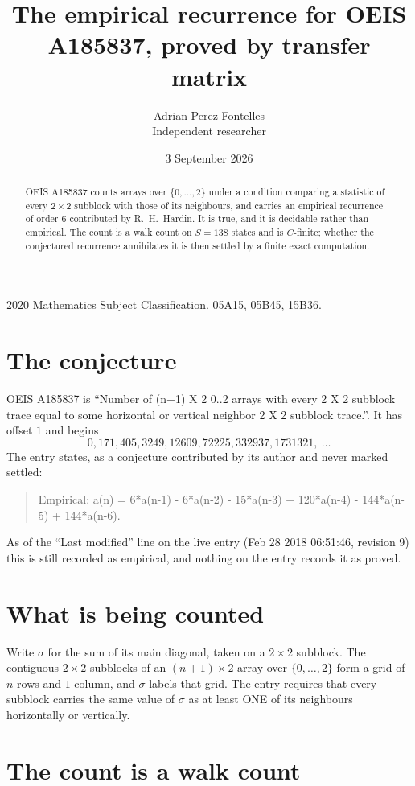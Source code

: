 \documentclass[11pt,a4paper]{article}
\title{The empirical recurrence for OEIS A185837, proved by transfer matrix}
\author{Adrian Perez Fontelles\\ \small Independent researcher}
\date{3 September 2026}
\theoremstyle{plain}
\theoremstyle{definition}
\begin{document}
\maketitle

\begin{abstract}
OEIS A185837 counts arrays over $\{0,\dots,2\}$ under a condition comparing a statistic of
every $2\times2$ subblock with those of its neighbours, and carries an empirical recurrence
of order $6$ contributed by R.~H.~Hardin. It is true, and it is decidable rather than
empirical. The count is a walk count on $S=138$ states and is $C$-finite; whether the
conjectured recurrence annihilates it is then settled by a finite exact computation.
\end{abstract}

\noindent\small 2020 Mathematics Subject Classification. 05A15, 05B45, 15B36.\normalsize

\section{The conjecture}

OEIS A185837 is ``Number of (n+1) X 2 0..2 arrays with every 2 X 2 subblock trace equal to some horizontal or vertical neighbor 2 X 2 subblock trace.''. It has offset $1$ and begins
\[
0, 171, 405, 3249, 12609, 72225, 332937, 1731321,\ \dots
\]
The entry states, as a conjecture contributed by its author and never marked settled:
\begin{quote}
Empirical: a(n) = 6*a(n-1) - 6*a(n-2) - 15*a(n-3) + 120*a(n-4) - 144*a(n-5) + 144*a(n-6).
\end{quote}
As of the ``Last modified'' line on the live entry (Feb 28 2018 06:51:46, revision 9) this is still
recorded as empirical, and nothing on the entry records it as proved.

\section{What is being counted}

Write $\sigma$ for the sum of its main diagonal, taken on a $2\times2$ subblock. The contiguous $2\times2$
subblocks of an $(n+1)\times2$ array over $\{0,\dots,2\}$ form a grid of $n$ rows
and $1$ column, and $\sigma$ labels that grid. The entry
requires that every subblock carries the same value of $\sigma$ as at least ONE of its neighbours horizontally or vertically.

\section{The count is a walk count}
\end{document}
